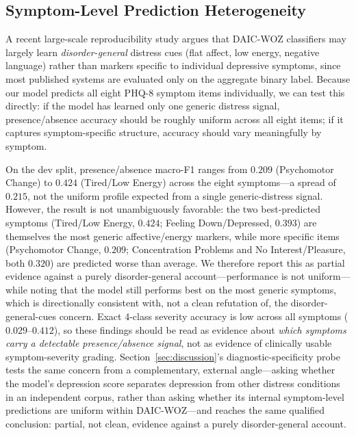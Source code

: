 \documentclass[5p,twocolumn]{elsarticle}
\begin{document}
\subsection{Symptom-Level Prediction Heterogeneity}
\label{sec:symptom}

A recent large-scale reproducibility study argues that DAIC-WOZ
classifiers may largely learn \emph{disorder-general} distress cues
(flat affect, low energy, negative language) rather than markers
specific to individual depressive symptoms, since most published
systems are evaluated only on the aggregate binary label. Because our
model predicts all eight PHQ-8 symptom items individually, we can test
this directly: if the model has learned only one generic distress
signal, presence/absence accuracy should be roughly uniform across
all eight items; if it captures symptom-specific structure, accuracy
should vary meaningfully by symptom.

On the dev split, presence/absence macro-F1 ranges from $0.209$
(Psychomotor Change) to $0.424$ (Tired/Low Energy) across the eight
symptoms---a spread of $0.215$, not the uniform profile expected from
a single generic-distress signal. However, the result is not
unambiguously favorable: the two best-predicted symptoms (Tired/Low
Energy, $0.424$; Feeling Down/Depressed, $0.393$) are themselves the
most generic affective/energy markers, while more specific items
(Psychomotor Change, $0.209$; Concentration Problems and No
Interest/Pleasure, both $0.320$) are predicted worse than average. We
therefore report this as partial evidence against a purely
disorder-general account---performance is not uniform---while noting
that the model still performs best on the most generic symptoms,
which is directionally consistent with, not a clean refutation of,
the disorder-general-cues concern. Exact 4-class severity accuracy is
low across all symptoms ($0.029$--$0.412$), so these findings should
be read as evidence about \emph{which symptoms carry a detectable
presence/absence signal}, not as evidence of clinically usable
symptom-severity grading. Section~\ref{sec:discussion}'s
diagnostic-specificity probe tests the same concern from a
complementary, external angle---asking whether the model's depression
score separates depression from other distress conditions in an
independent corpus, rather than asking whether its internal
symptom-level predictions are uniform within DAIC-WOZ---and reaches
the same qualified conclusion: partial, not clean, evidence against a
purely disorder-general account.
\end{document}
